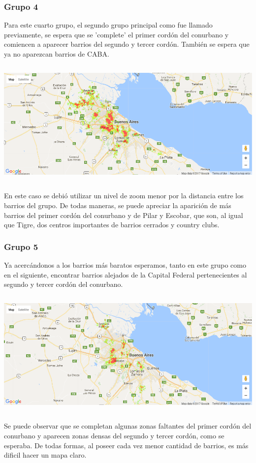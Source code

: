 \documentclass[a4paper, 10pt]{article}
\newcommand\tab[1][0.5cm]{\hspace*{#1}}
\begin{document}
				\subsubsection{Grupo 4}
					Para este cuarto grupo, el segundo grupo principal como fue llamado previamente, se espera que se 'complete' el
					primer cordón del conurbano y comiencen a aparecer barrios del segundo y tercer cordón. También se espera que ya
					no aparezcan barrios de CABA.
					\begin{center}
						\includegraphics[width=6in, height=2.46in]{images/m2Group4HeatMap}
				  	\end{center}
				  	\tab En este caso se debió utilizar un nivel de zoom menor por la distancia entre los barrios del grupo. De todas
				  	maneras, se puede apreciar la aparición de más barrios del primer cordón del conurbano y de Pilar y Escobar, que
				  	son, al igual que Tigre, dos centros importantes de barrios cerrados y country clubs.
				\subsubsection{Grupo 5}
					Ya acercándonos a los barrios más baratos esperamos, tanto en este grupo como en el siguiente, encontrar
					barrios alejados de la Capital Federal pertenecientes al segundo y tercer cordón del conurbano.
					\begin{center}
						\includegraphics[width=6in, height=2.46in]{images/m2Group5HeatMap}
				  	\end{center}
				  	\tab Se puede observar que se completan algunas zonas faltantes del primer cordón del conurbano y aparecen zonas
				  	densas del segundo y tercer cordón, como se esperaba. De todas formas, al poseer cada vez menor cantidad de
				  	barrios, es más dificil hacer un mapa claro.
\end{document}
